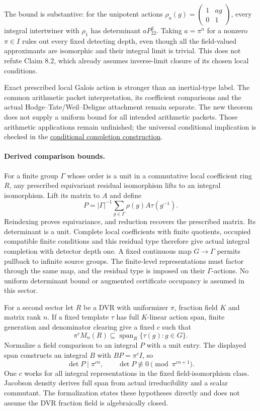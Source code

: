 \documentclass[11pt]{article}
\theoremstyle{definition}
\theoremstyle{remark}
\begin{document}
The bound is substantive: for the unipotent actions
$\rho_a(g)=\begin{pmatrix}1&ag\\0&1\end{pmatrix}$, every integral intertwiner
with $\rho_1$ has determinant $aP_{22}^2$. Taking $a=\pi^n$ for a nonzero
$\pi\in I$ rules out every
fixed detecting depth, even though all the field-valued approximants are
isomorphic and their integral limit is trivial. This does not refute Claim 8.2,
which already assumes inverse-limit closure of its chosen local conditions.

Exact prescribed local Galois action is stronger than an inertial-type label.
The common arithmetic packet interpretation, its coefficient comparisons and
the actual Hodge--Tate/Weil--Deligne attachment remain separate. The new theorem
does not supply a uniform bound for all intended arithmetic packets. Those
arithmetic applications remain unfinished; the universal conditional implication
is checked in the \hyperref[book:x-construction-23]{conditional completion construction}.

\paragraph{Derived comparison bounds.}\label{book:x-construction-16}
For a finite group $\Gamma$ whose order is a unit in a commutative local
coefficient ring $R$, any prescribed equivariant residual isomorphism lifts to
an integral isomorphism. Lift its matrix to $A$ and define
\[
P=|\Gamma|^{-1}\sum_{g\in\Gamma}\rho(g)A\tau(g^{-1}).
\]
Reindexing proves equivariance, and reduction recovers the prescribed matrix.
Its determinant is a unit. Complete local coefficients with finite quotients,
occupied compatible finite conditions and this residual type therefore give
actual integral completion with detector depth one. A fixed continuous map
$G\to\Gamma$ permits pullback to infinite source groups. The finite-level
representations must factor through the same map, and the residual type is
imposed on their $\Gamma$-actions. No uniform determinant bound or augmented
certificate occupancy is assumed in this sector.

For a second sector let $R$ be a DVR with uniformizer $\pi$, fraction field $K$
and matrix rank $n$. If a fixed template $\tau$ has full $K$-linear action span,
finite generation and denominator clearing give a fixed $c$ such that
\[
\pi^c M_n(R)\subseteq\operatorname{span}_R\{\tau(g):g\in G\}.
\]
Normalize a field comparison to an integral $P$ with a unit entry. The displayed
span constructs an integral $B$ with $BP=\pi^cI$, so
\[
\det P\mid\pi^{cn},\qquad \det P\not\equiv0\pmod{\pi^{cn+1}}.
\]
One $c$ works for all integral representations in the fixed field-isomorphism
class. Jacobson density derives full span from actual irreducibility and a
scalar commutant. The formalization states these hypotheses directly and does
not assume the DVR fraction field is algebraically closed.
\end{document}
